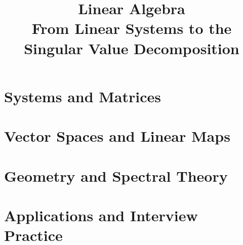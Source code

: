 \documentclass[11pt,a4paper,oneside]{book}
\title{\Huge\bfseries Linear Algebra\\[0.3em]\Large From Linear Systems to the Singular Value Decomposition}
\author{}
\date{}
\theoremstyle{plain}
\theoremstyle{definition}
\theoremstyle{remark}
\begin{document}
\frontmatter
\maketitle
\tableofcontents
\mainmatter

\part{Systems and Matrices}






\part{Vector Spaces and Linear Maps}






\part{Geometry and Spectral Theory}








\part{Applications and Interview Practice}




\end{document}
